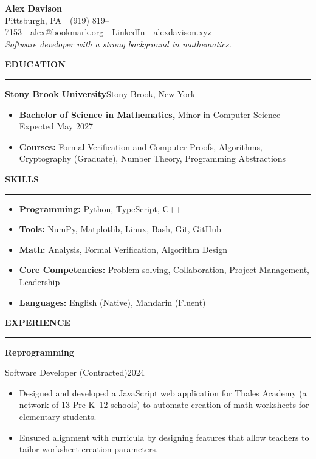 \documentclass[10pt,letterpaper]{article}
\newcommand{\ressection}[1]{%
  \par\addvspace{7pt}%
  {\large\bfseries #1}\par\nobreak
  \vspace{2pt}\noindent\rule{\linewidth}{1pt}\par\nobreak
  \vspace{4pt}%
}
\newcommand{\entry}[2]{%
  \par\addvspace{4pt}%
  \noindent\textbf{#1}\hfill #2\par\nobreak
}
\newcommand{\subentry}[2]{%
  \noindent #1\hfill #2\par
}
\begin{document}
\begin{center}
  {\fontsize{18}{21}\selectfont\bfseries Alex Davison}\\[3pt]
  {\footnotesize Pittsburgh, PA\ \textperiodcentered\ (919) 819--7153\ \textperiodcentered\ \href{mailto:alex@bookmark.org}{alex@bookmark.org}\ \textperiodcentered\ \href{https://www.linkedin.com/in/alexander-davison-62086127b/}{LinkedIn}\ \textperiodcentered\ \href{https://alexdavison.xyz/}{alexdavison.xyz}}\\[3pt]
  {\small\itshape Software developer with a strong background in mathematics.}
\end{center}

\ressection{EDUCATION}

\entry{Stony Brook University}{Stony Brook, New York}
\begin{itemize}
  \item \textbf{Bachelor of Science in Mathematics,} Minor in Computer Science \hfill Expected May 2027
  \item \textbf{Courses:} Formal Verification and Computer Proofs, Algorithms, Cryptography (Graduate), Number Theory, Programming Abstractions
\end{itemize}

\ressection{SKILLS}

\begin{itemize}
  \item \textbf{Programming:} Python, TypeScript, C++
  \item \textbf{Tools:} NumPy, Matplotlib, Linux, Bash, Git, GitHub
  \item \textbf{Math:} Analysis, Formal Verification, Algorithm Design
  \item \textbf{Core Competencies:} Problem-solving, Collaboration, Project Management, Leadership
  \item \textbf{Languages:} English (Native), Mandarin (Fluent)
\end{itemize}

\ressection{EXPERIENCE}

\entry{Reprogramming}{}
\subentry{Software Developer (Contracted)}{2024}
\begin{itemize}
  \item Designed and developed a JavaScript web application for Thales Academy (a network of 13 Pre-K--12 schools) to automate creation of math worksheets for elementary students.
  \item Ensured alignment with curricula by designing features that allow teachers to tailor worksheet creation parameters.
\end{itemize}
\end{document}
